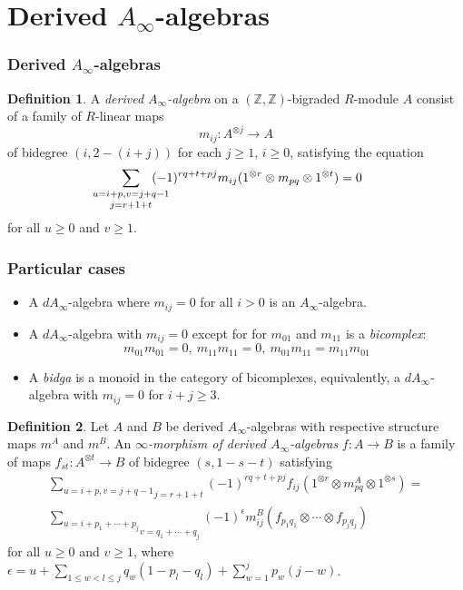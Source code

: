 \documentclass{beamer}
\theoremstyle{definition}
\newtheorem{defi}{Definition}
\newcommand{\Z}{\mathbb{Z}}
\begin{document}
\section{Derived $A_\infty$-algebras}

\begin{frame}
\frametitle{Derived $A_\infty$-algebras}
\begin{defi}
  A \emph{derived $A_\infty$-algebra} on a $(\Z,\Z)$-bigraded $R$-module $A$ consist of a family of $R$-linear maps 
\[m_{ij}:A^{\otimes j}\to A\]
of bidegree $(i,2-(i+j))$ for each $j\geq 1$, $i\geq 0$, satisfying the equation
\begin{equation*}
\underset{j=r+1+t}{\sum_{\mathclap{u=i+p, v=j+q-1}}}(-1)^{rq+t+pj}m_{ij}(1^{\otimes r}\otimes m_{pq}\otimes 1^{\otimes t})=0
\end{equation*}
for all $u\geq 0$ and $v\geq 1$. 
\end{defi}
\end{frame}

\begin{frame}
\frametitle{Particular cases}
\begin{itemize}
\item<1-> A $dA_\infty$-algebra where $m_{ij}=0$ for all $i>0$ is an $A_\infty$-algebra.
\item<2-> A $dA_\infty$-algebra with $m_{ij}=0$ except for for $m_{01}$ and $m_{11}$ is a \emph{bicomplex}: 
\[m_{01}m_{01}=0,\ m_{11}m_{11}=0,\ m_{01}m_{11}=m_{11}m_{01}\]
\item<3-> A \emph{bidga} is a monoid in the category of bicomplexes, equivalently, a $dA_\infty$-algebra with $m_{ij}=0$ for $i+j\geq 3$.
\end{itemize}
\end{frame}

\begin{frame}
\begin{defi}
Let $A$ and $B$ be derived $A_\infty$-algebras with respective structure maps $m^A$ and $m^B$. An \emph{$\infty$-morphism of derived $A_\infty$-algebras} $f:A\to B$ is a family of maps $f_{st}:A^{\otimes t}\to B$ of bidegree $(s,1-s-t)$ satisfying
\begin{align*}
\underset{j=r+1+t}{\sum_{u=i+p, v=j+q-1}}(-1)^{rq+t+pj}f_{ij}(1^{\otimes r}\otimes m_{pq}^A\otimes 1^{\otimes s})=\\
\underset{v=q_1+\cdots +q_j}{\sum_{u=i+p_1+\cdots +p_j}}(-1)^{\epsilon} m^B_{ij}(f_{p_1 q_1}\otimes\cdots\otimes f_{p_j q_j})
\end{align*}
for all $u\geq 0$ and $v\geq 1$, where
$\epsilon = u + \sum_{1\leq w < l \leq j} q_w(1-p_l-q_l)  + \sum_{w=1}^j p_w(j-w)$.
\end{defi}
\end{frame}
\end{document}
